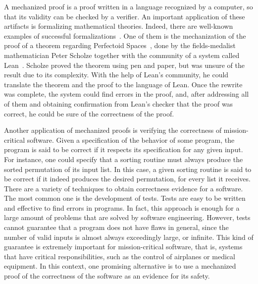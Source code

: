 A mechanized proof is a proof written in a language recognized by a computer, so that its validity can be checked by a verifier. An important application of these artifacts is formalizing mathematical theories. Indeed, there are well-known examples of successful formalizations~\cite{fourColors, kepler}. One of them is the mechanization of the proof of a theorem regarding Perfectoid Spaces~\cite{scholze}, done by the fields-medalist mathematician Peter Scholze together with the community of a system called Lean~\cite{lean}. Scholze proved the theorem using pen and paper, but was unsure of the result due to its complexity. With the help of Lean's community, he could translate the theorem and the proof to the language of Lean. Once the rewrite was complete, the system could find errors in the proof, and, after addressing all of them and obtaining confirmation from Lean's checker that the proof was correct, he could be sure of the correctness of the proof.

Another application of mechanized proofs is verifying the correctness of mission-critical software. Given a specification of the behavior of some program, the program is said to be correct if it respects its specification for any given input. For instance, one could specify that a sorting routine must always produce the sorted permutation of its input list. In this case, a given sorting routine is said to be correct if it indeed produces the desired permutation, for every list it receives. There are a variety of techniques to obtain correctness evidence for a software. The most common one is the development of tests. Tests are easy to be written and effective to find errors in programs. In fact, this approach is enough for a large amount of problems that are solved by software engineering. However, tests cannot guarantee that a program does not have flaws in general, since the number of valid inputs is almost always exceedingly large, or infinite. This kind of guarantee is extremely important for mission-critical software, that is, systems that have critical responsibilities, such as the control of airplanes or medical equipment. In this context, one promising alternative is to use a mechanized proof of the correctness of the software as an evidence for its safety.

